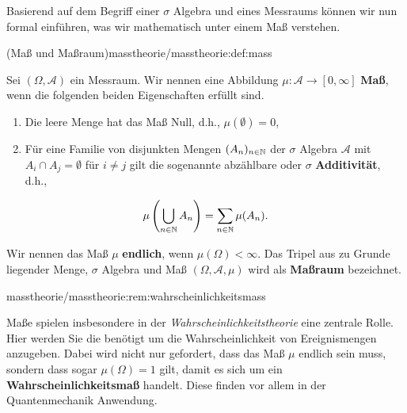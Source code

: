 \par
Basierend auf dem Begriff einer \(\sigma\) Algebra und eines Messraums können wir nun formal einführen, was wir mathematisch unter einem Maß verstehen.
\begin{definition}{(Maß und Maßraum)}{masstheorie/masstheorie:def:mass}



\par
Sei \((\Omega, \mathcal{A})\) ein Messraum.
Wir nennen eine Abbildung \(\mu: \mathcal{A}\to [0, \infty]\) \textbf{Maß}, wenn die folgenden beiden Eigenschaften erfüllt sind.
\begin{enumerate}

\item {} 
\par
Die leere Menge hat das Maß Null, d.h., \(\mu(\emptyset) = 0\),

\item {} 
\par
Für eine Familie von disjunkten Mengen \((A_n)_{n\in\mathbb{N}}\) der \(\sigma\) Algebra \(\mathcal{A}\) mit \(A_i \cap A_j = \emptyset\) für \(i \neq j\) gilt die sogenannte abzählbare oder \(\sigma\) \textbf{Additivität}, d.h.,

\end{enumerate}
\begin{align*}
\mu\left( \bigcup_{n\in\mathbb{N}}A_n \right) = \sum_{n\in\mathbb{N}}\mu (A_n).
\end{align*}
\par
Wir nennen das Maß \(\mu\) \textbf{endlich}, wenn \(\mu(\Omega)<\infty\).
Das Tripel aus zu Grunde liegender Menge, \(\sigma\) Algebra und Maß \((\Omega, \mathcal{A}, \mu)\) wird als \textbf{Maßraum} bezeichnet.
\end{definition}
\begin{remark}{}{masstheorie/masstheorie:rem:wahrscheinlichkeitsmass}



\par
Maße spielen insbesondere in der \emph{Wahrscheinlichkeitstheorie} eine zentrale Rolle.
Hier werden Sie die benötigt um die Wahrscheinlichkeit von Ereignismengen anzugeben.
Dabei wird nicht nur gefordert, dass das Maß \(\mu\) endlich sein muss, sondern dass sogar \(\mu(\Omega)=1\) gilt, damit es sich um ein \textbf{Wahrscheinlichkeitsmaß} handelt.
Diese finden vor allem in der Quantenmechanik Anwendung.
\end{remark}

